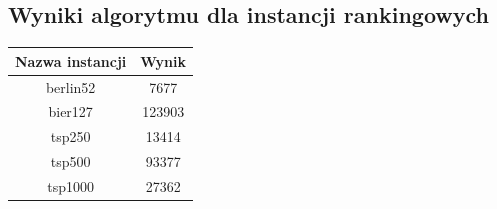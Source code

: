 \documentclass[11pt]{article}
\begin{document}
\subsection{Wyniki algorytmu dla instancji rankingowych}\label{sub:wyniki_algorytmu_dla_instancji_rankingowych} %
\begin{center}
	\Large
	\begin{tabular}{c | c}
		\textbf{Nazwa instancji} & \textbf{Wynik} \\
		\hline\hline
		berlin52                 & 7677           \\ \hline
		bier127                  & 123903         \\ \hline
		tsp250                   & 13414          \\ \hline
		tsp500                   & 93377          \\ \hline
		tsp1000                  & 27362
	\end{tabular}
\end{center}


\end{document}
